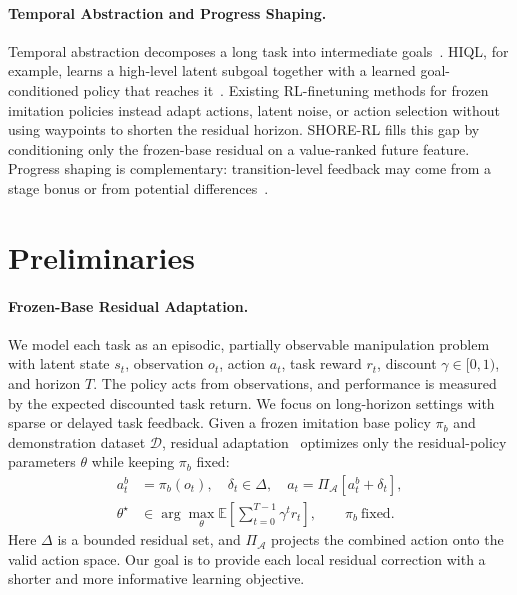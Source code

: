 \documentclass[letterpaper]{article} %
\begin{document}
\paragraph{Temporal Abstraction and Progress Shaping.}
Temporal abstraction decomposes a long task into intermediate
goals~\cite{nachum2018hiro,fang2022ptp,shi2023skimo,zheng2024prise,sutton1999between,kulkarni2016hierarchical,dietterich2000maxq}. HIQL, for
example, learns a high-level latent subgoal together with a learned goal-conditioned
policy that reaches it~\cite{park2023hiql}. Existing RL-finetuning methods for
frozen imitation policies instead adapt actions, latent noise, or action
selection without using waypoints to shorten the residual horizon.
SHORE-RL fills this gap by conditioning only the frozen-base residual on a
value-ranked future feature. Progress shaping is complementary:
transition-level feedback may come from a stage bonus or from potential
differences~\cite{ng1999policy,devlin2012dynamic,wiewiora2003principled}.

\section{Preliminaries}
\paragraph{Frozen-Base Residual Adaptation.}
We model each task as an episodic, partially observable manipulation problem
with latent state $s_t$, observation $o_t$, action $a_t$, task reward $r_t$, discount
$\gamma\in[0,1)$, and horizon $T$. The policy acts from observations, and
performance is measured by the expected discounted task return. We focus on
long-horizon settings with sparse or delayed task feedback. Given a frozen
imitation base policy $\pi_b$ and demonstration dataset $\mathcal D$, residual
adaptation~\cite{johannink2019residual,resfit2025residual} optimizes only the
residual-policy parameters $\theta$ while keeping $\pi_b$ fixed:
\begin{equation}
\begin{aligned}
a_t^b&=\pi_b(o_t),\quad \delta_t\in\Delta,\quad
a_t=\Pi_{\mathcal A}[a_t^b+\delta_t],\\
\theta^\star&\in\arg\max_\theta
\mathbb E\!\left[\sum_{t=0}^{T-1}\gamma^t r_t\right],
\qquad \pi_b\ \text{fixed}.
\end{aligned}
\label{eq:frozen-base-residual-adaptation}
\end{equation}
Here $\Delta$ is a bounded residual set, and $\Pi_{\mathcal A}$ projects the
combined action onto the valid action space. Our goal is to provide each local
residual correction with a shorter and more informative learning objective.
\end{document}
